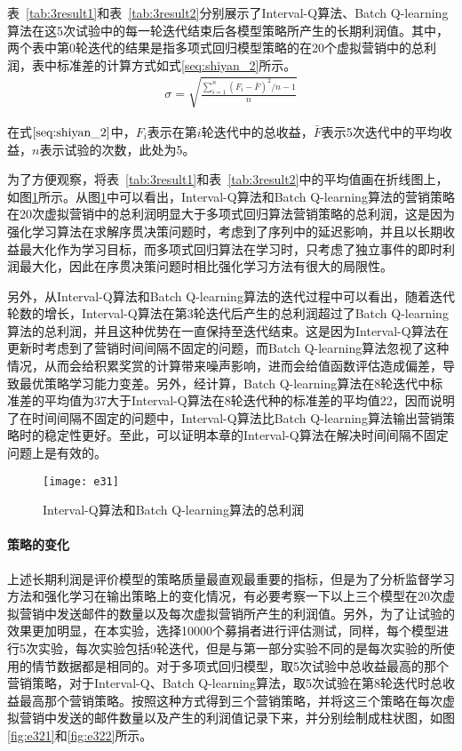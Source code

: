 表~\ref{tab:3result1}和表~\ref{tab:3result2}分别展示了Interval-Q算法、Batch Q-learning算法在这5次试验中的每一轮迭代结束后各模型策略所产生的长期利润值。其中，两个表中第0轮迭代的结果是指多项式回归模型策略的在20个虚拟营销中的总利润，表中标准差的计算方式如式\eqref{seq:shiyan_2}所示。
\begin{equation}\label{seq:shiyan_2}
\begin{aligned}
\sigma = \sqrt{\frac{\sum_{i=1}^{n}(F_{i}-\bar{F})^{2}/n-1}{n}}
\end{aligned}
\end{equation}

在式$\eqref{seq:shiyan_2}$中，$F_{i}$表示在第$i$轮迭代中的总收益，$\bar{F}$表示5次迭代中的平均收益，$n$表示试验的次数，此处为5。

为了方便观察，将表~\ref{tab:3result1}和表~\ref{tab:3result2}中的平均值画在折线图上，如图\ref{fig:e31}所示。从图\ref{fig:e31}中可以看出，Interval-Q算法和Batch Q-learning算法的营销策略在20次虚拟营销中的总利润明显大于多项式回归算法营销策略的总利润，这是因为强化学习算法在求解序贯决策问题时，考虑到了序列中的延迟影响，并且以长期收益最大化作为学习目标，而多项式回归算法在学习时，只考虑了独立事件的即时利润最大化，因此在序贯决策问题时相比强化学习方法有很大的局限性。

另外，从Interval-Q算法和Batch Q-learning算法的迭代过程中可以看出，随着迭代轮数的增长，Interval-Q算法在第3轮迭代后产生的总利润超过了Batch Q-learning算法的总利润，并且这种优势在一直保持至迭代结束。这是因为Interval-Q算法在更新时考虑到了营销时间间隔不固定的问题，而Batch Q-learning算法忽视了这种情况，从而会给积累奖赏的计算带来噪声影响，进而会给值函数评估造成偏差，导致最优策略学习能力变差。另外，经计算，Batch Q-learning算法在8轮迭代中标准差的平均值为37大于Interval-Q算法在8轮迭代种的标准差的平均值22，因而说明了在时间间隔不固定的问题中，Interval-Q算法比Batch Q-learning算法输出营销策略时的稳定性更好。至此，可以证明本章的Interval-Q算法在解决时间间隔不固定问题上是有效的。

\begin{figure}[htbp]
\centering
\texttt{[image: e31]}
\caption{Interval-Q算法和Batch Q-learning算法的总利润}
\label{fig:e31}
\end{figure}

\paragraph{策略的变化}
上述长期利润是评价模型的策略质量最直观最重要的指标，但是为了分析监督学习方法和强化学习在输出策略上的变化情况，有必要考察一下以上三个模型在20次虚拟营销中发送邮件的数量以及每次虚拟营销所产生的利润值。另外，为了让试验的效果更加明显，在本实验，选择10000个募捐者进行评估测试，同样，每个模型进行5次实验，每次实验包括9轮迭代，但是与第一部分实验不同的是每次实验的所使用的情节数据都是相同的。对于多项式回归模型，取5次试验中总收益最高的那个营销策略，对于Interval-Q、Batch Q-learning算法，取5次试验在第8轮迭代时总收益最高那个营销策略。按照这种方式得到三个营销策略，并将这三个策略在每次虚拟营销中发送的邮件数量以及产生的利润值记录下来，并分别绘制成柱状图，如图\ref{fig:e321}和\ref{fig:e322}所示。

